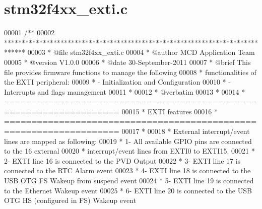 \section{stm32f4xx\+\_\+exti.\+c}
\label{stm32f4xx__exti_8c_source}

\begin{DoxyCode}
00001 \textcolor{comment}{/**}
00002 \textcolor{comment}{  ******************************************************************************}
00003 \textcolor{comment}{  * @file    stm32f4xx\_exti.c}
00004 \textcolor{comment}{  * @author  MCD Application Team}
00005 \textcolor{comment}{  * @version V1.0.0}
00006 \textcolor{comment}{  * @date    30-September-2011}
00007 \textcolor{comment}{  * @brief   This file provides firmware functions to manage the following }
00008 \textcolor{comment}{  *          functionalities of the EXTI peripheral:           }
00009 \textcolor{comment}{  *           - Initialization and Configuration}
00010 \textcolor{comment}{  *           - Interrupts and flags management}
00011 \textcolor{comment}{  *}
00012 \textcolor{comment}{  *  @verbatim  }
00013 \textcolor{comment}{  *  }
00014 \textcolor{comment}{  *          ===================================================================}
00015 \textcolor{comment}{  *                                     EXTI features}
00016 \textcolor{comment}{  *          ===================================================================}
00017 \textcolor{comment}{  *    }
00018 \textcolor{comment}{  *          External interrupt/event lines are mapped as following:}
00019 \textcolor{comment}{  *            1- All available GPIO pins are connected to the 16 external }
00020 \textcolor{comment}{  *               interrupt/event lines from EXTI0 to EXTI15.}
00021 \textcolor{comment}{  *            2- EXTI line 16 is connected to the PVD Output}
00022 \textcolor{comment}{  *            3- EXTI line 17 is connected to the RTC Alarm event}
00023 \textcolor{comment}{  *            4- EXTI line 18 is connected to the USB OTG FS Wakeup from suspend event               
                           }
00024 \textcolor{comment}{  *            5- EXTI line 19 is connected to the Ethernet Wakeup event}
00025 \textcolor{comment}{  *            6- EXTI line 20 is connected to the USB OTG HS (configured in FS) Wakeup event }

\end{DoxyCode}
